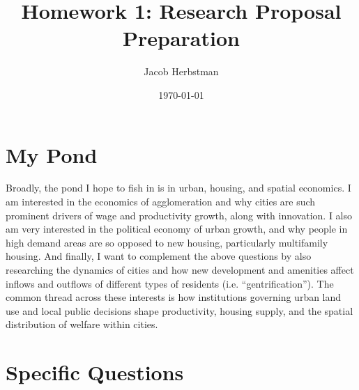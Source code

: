 \documentclass{article}
\title{Homework 1: Research Proposal Preparation}
\author{Jacob Herbstman}
\date{\today}
\begin{document}
\maketitle

\section{My Pond}

Broadly, the pond I hope to fish in is in urban, housing, and spatial economics. 
I am interested in the economics of agglomeration and why cities are such prominent drivers of wage and productivity growth, along with innovation. 
I also am very interested in the political economy of urban growth, and why people in high demand areas are so opposed to new housing, particularly multifamily housing. 
And finally, I want to complement the above questions by also researching the dynamics of cities and how new development and amenities affect inflows and outflows of different types of residents (i.e. ``gentrification'').
The common thread across these interests is how institutions governing urban land use and local public decisions shape productivity, housing supply, and the spatial distribution of welfare within cities.
\section{Specific Questions}
\end{document}
